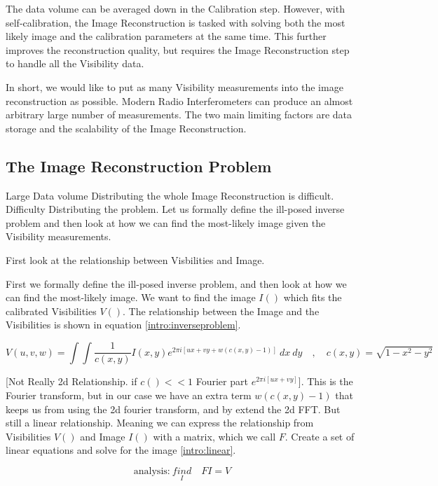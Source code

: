 The data volume can be averaged down in the Calibration step. However, with self-calibration, the Image Reconstruction is tasked with solving both the most likely image and the calibration parameters at the same time. This further improves the reconstruction quality\cite{Wiaux-selfcal}, but requires the Image Reconstruction step to handle all the Visibility data.

In short, we would like to put as many Visibility measurements into the image reconstruction as possible. Modern Radio Interferometers can produce an almost arbitrary large number of measurements. The two main limiting factors are data storage and the scalability of the Image Reconstruction. 


\subsection{The Image Reconstruction Problem}
Large Data volume
Distributing the whole Image Reconstruction is difficult.
Difficulty Distributing the problem.
Let us formally define the ill-posed inverse problem and then look at how we can find the most-likely image given the Visibility measurements.

First look at the relationship between Visbilities and Image. 

First we formally define the ill-posed inverse problem, and then look at how we can find the most-likely image.
We want to find the image $I()$ which fits the calibrated Visibilities $V()$. The relationship between the Image and the Visibilities is shown in equation \eqref{intro:inverseproblem}.

\begin{equation}\label{intro:inverseproblem}
V(u, v, w) = \int\int \frac{1}{c(x, y)} I(x, y) e^{2 \pi i [ux+vy+ w(c(x, y) - 1)]} \: dx \: dy \quad, \quad c(x,y) = \sqrt{1 - x^2 - y ^2}
\end{equation}

[Not Really 2d Relationship. if $c() << 1$ Fourier part $e^{2 \pi i [ux+vy]}$]. This is the Fourier transform, but in our case we have an extra term $w(c(x, y) - 1)$ that keeps us from using the 2d fourier transform, and by extend the 2d FFT.
But still a linear relationship. Meaning we can express the relationship from Visibilities $V()$ and Image $I()$ with a matrix, which we call $F$.
Create a set of linear equations and solve for the image \eqref{intro:linear}. 

\begin{equation}\label{intro:linear}
\text{analysis:}\: \underset{I}{find}\quad FI = V
\end{equation}

